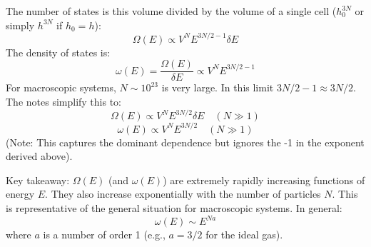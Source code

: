 \documentclass[11pt]{article}
\newcommand{\OmegaE}{\Omega(E)}
\newcommand{\omegaE}{\omega(E)}
\newcommand{\deltaE}{\delta E}
\begin{document}
The number of states is this volume divided by the volume of a single cell ($h_0^{3N}$ or simply $h^{3N}$ if $h_0=h$):
\[ \OmegaE \propto V^N E^{3N/2 - 1} \deltaE \]
The density of states is:
\[ \omegaE = \frac{\OmegaE}{\deltaE} \propto V^N E^{3N/2 - 1} \]
For macroscopic systems, $N \sim 10^{23}$ is very large. In this limit $3N/2 - 1 \approx 3N/2$. The notes simplify this to:
\[ \OmegaE \propto V^N E^{3N/2} \deltaE \quad (N \gg 1) \]
\[ \omegaE \propto V^N E^{3N/2} \quad (N \gg 1) \]
(Note: This captures the dominant dependence but ignores the -1 in the exponent derived above).

Key takeaway: $\OmegaE$ (and $\omegaE$) are extremely rapidly increasing functions of energy $E$. They also increase exponentially with the number of particles $N$.
This is representative of the general situation for macroscopic systems. In general:
\[ \omegaE \sim E^{Na} \]
where $a$ is a number of order 1 (e.g., $a=3/2$ for the ideal gas).
\end{document}
